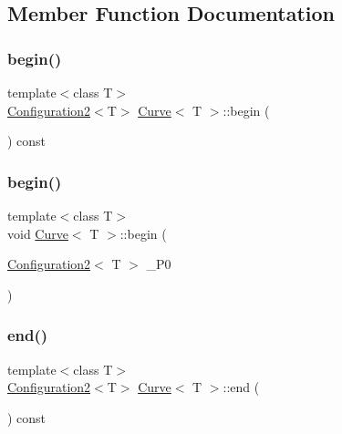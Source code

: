 \subsection{Member Function Documentation}
\mbox{\label{class_curve_a5d0d409315773f72642e4323cb202711}} 
\subsubsection{\texorpdfstring{begin()}{begin()}\hspace{0.1cm}{\footnotesize\ttfamily [1/2]}}
{\footnotesize\ttfamily template$<$class T$>$ \\
\mbox{\hyperlink{class_configuration2}{Configuration2}}$<$T$>$ \mbox{\hyperlink{class_curve}{Curve}}$<$ T $>$\+::begin (\begin{DoxyParamCaption}{ }\end{DoxyParamCaption}) const\hspace{0.3cm}{\ttfamily [inline]}}

\mbox{\label{class_curve_a450ecb2eb0200c4f175ad5fc6afe4cb2}} 
\subsubsection{\texorpdfstring{begin()}{begin()}\hspace{0.1cm}{\footnotesize\ttfamily [2/2]}}
{\footnotesize\ttfamily template$<$class T$>$ \\
void \mbox{\hyperlink{class_curve}{Curve}}$<$ T $>$\+::begin (\begin{DoxyParamCaption}\item[{\mbox{\hyperlink{class_configuration2}{Configuration2}}$<$ T $>$}]{\+\_\+\+P0 }\end{DoxyParamCaption})\hspace{0.3cm}{\ttfamily [inline]}}

\mbox{\label{class_curve_a08b72b1c8922c1132254d8f2b98fd78d}} 
\subsubsection{\texorpdfstring{end()}{end()}\hspace{0.1cm}{\footnotesize\ttfamily [1/2]}}
{\footnotesize\ttfamily template$<$class T$>$ \\
\mbox{\hyperlink{class_configuration2}{Configuration2}}$<$T$>$ \mbox{\hyperlink{class_curve}{Curve}}$<$ T $>$\+::end (\begin{DoxyParamCaption}{ }\end{DoxyParamCaption}) const\hspace{0.3cm}{\ttfamily [inline]}}

